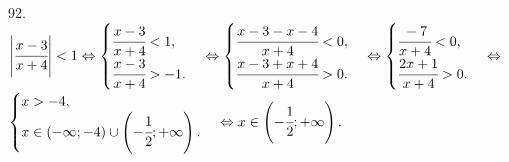 92. $\left|\cfrac{x-3}{x+4}\right|<1\Leftrightarrow
\begin{cases} \cfrac{x-3}{x+4}<1,\\
\cfrac{x-3}{x+4}>-1.\end{cases}\Leftrightarrow
\begin{cases} \cfrac{x-3-x-4}{x+4}<0,\\
\cfrac{x-3+x+4}{x+4}>0.\end{cases}\Leftrightarrow
\begin{cases} \cfrac{-7}{x+4}<0,\\
\cfrac{2x+1}{x+4}>0.\end{cases}\Leftrightarrow$\\$
\begin{cases} x>-4,\\
x\in(-\infty;-4)\cup\left(-\cfrac{1}{2};+\infty\right).\end{cases}\Leftrightarrow
x\in\left(-\cfrac{1}{2};+\infty\right).$\\
